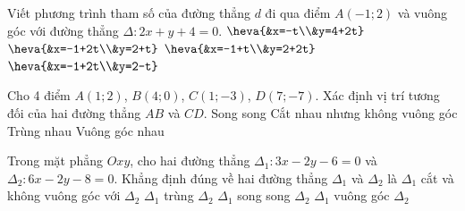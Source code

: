 \begin{ex}%
	Viết phương trình tham số của đường  thẳng $ d $ đi qua điểm $ A(-1;2) $ và vuông góc với đường thẳng $ \Delta\colon 2x+y+4=0 $.
	\choice 
		{$  \heva{&x=-t\\&y=4+2t} $}
		{\True $ \heva{&x=-1+2t\\&y=2+t}  $}
		 {$ \heva{&x=-1+t\\&y=2+2t} $}
		{$ \heva{&x=-1+2t\\&y=2-t}  $}
\end{ex}

\begin{ex}%
	Cho 4 điểm $A(1; 2)$, $B(4; 0)$, $C(1;-3)$, $D(7;-7)$. Xác định vị trí tương đối của hai  đường thẳng $A B$ và $C D$.
	 \choice
		{\True  Song song}
		{Cắt nhau  nhưng không vuông góc}
		 {Trùng nhau}
		{Vuông góc  nhau}
\end{ex}

\begin{ex}%
	Trong mặt phẳng $Oxy$, cho hai đường thẳng $\Delta_1\colon 3x-2y-6=0$ và $\Delta_2\colon  6x-2y-8=0$. Khẳng định đúng về hai đường thẳng $\Delta_1$ và $\Delta_2$ là
	 \choice
		{\True $\Delta_1$ cắt và không  vuông góc với $\Delta_2$}
		 {$\Delta_1$ trùng $\Delta_2$}
		{$\Delta_1$ song song  $\Delta_2$}
		 {$\Delta_1$ vuông góc $\Delta_2$}
\end{ex}

